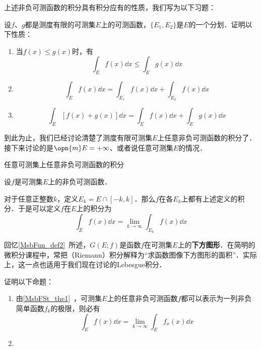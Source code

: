 上述非负可测函数的积分具有积分应有的性质，我们写为以下习题：

\begin{exercise}{}
设$f$、$g$都是测度有限的可测集$E$上的可测函数，$\{E_1, E_2\}$是$E$的一个分划．证明以下性质：
\begin{enumerate}
\item 当$f(x)\leq g(x)$时，有
\begin{equation}
\int_E f(x) \dd x\leq \int_E g(x) \dd x
\end{equation}
\item 
\begin{equation}
\int_E f(x) \dd x=\int_{E_1} f(x) \dd x+\int_{E_2} f(x) \dd x
\end{equation}
\item 
\begin{equation}
\int_E [f(x)+g(x)] \dd x = \int_E f(x) \dd x+\int_E g(x) \dd x
\end{equation}
\end{enumerate}

\end{exercise}


到此为止，我们已经讨论清楚了测度有限可测集$E$上任意非负可测函数的积分了．接下来讨论的是$\opn{m}E=+\infty$、或者说任意可测集$E$的情况．

\begin{definition}{任意可测集上任意非负可测函数的积分}

设$f$是可测集$E$上的非负可测函数．

对于任意正整数$k$，定义$E_k=E\cap [-k, k]$．那么$f$在各$E_k$上都有上述定义的积分．于是可以定义$f$在$E$上的积分为
\begin{equation}
\int_E f(x) \dd x = \lim\limits_{k\to\infty}\int_{E_k} f(x) \dd x
\end{equation}

\end{definition}


回忆\autoref{MsbFun_def2}~所述，$G(E; f)$是函数$f$在可测集$E$上的\textbf{下方图形}．在简明的微积分课程中，常把（Riemann）积分解释为“求函数图像下方图形的面积”．实际上，这一点也适用于我们现在讨论的Lebesgue积分．

\begin{exercise}{}
证明以下命题：

\begin{enumerate}
\item 由\autoref{MsbFSt_the1}~，可测集$E$上的任意非负可测函数$f$都可以表示为一列非负简单函数$f_k$的极限，则必有
\begin{equation}
\int_E f(x) \dd x = \lim\limits_{k\to\infty} \int_{E} f_x(x) \dd x
\end{equation}
\item 
\end{enumerate}
\end{exercise}















